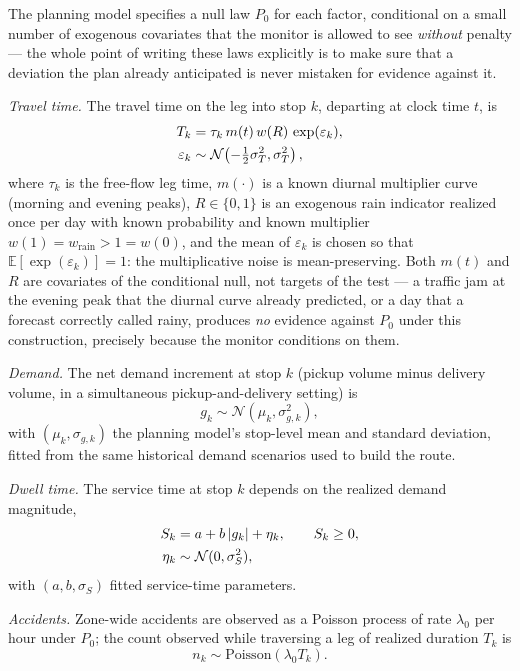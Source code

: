 \documentclass[trsc,dblanonrev]{informs4}
\newcommand{\E}{\mathbb{E}}
\newcommand{\N}{\mathcal{N}}
\begin{document}
The planning model specifies a null law $P_0$ for each factor,
conditional on a small number of exogenous covariates that the monitor
is allowed to see \emph{without} penalty --- the whole point of writing
these laws explicitly is to make sure that a deviation the plan already
anticipated is never mistaken for evidence against it.

\emph{Travel time.} The travel time on the leg into stop $k$, departing
at clock time $t$, is
\begin{align}
T_k &= \tau_k \, m(t) \, w(R) \, \exp(\varepsilon_k), \label{eq:travel}\\
\varepsilon_k &\sim \N\!\left(-\tfrac{1}{2}\sigma_T^2, \sigma_T^2\right),
\notag
\end{align}
where $\tau_k$ is the free-flow leg time, $m(\cdot)$ is a known diurnal
multiplier curve (morning and evening peaks), $R \in \{0,1\}$ is an
exogenous rain indicator realized once per day with known probability
and known multiplier $w(1) = w_{\mathrm{rain}} > 1 = w(0)$, and the mean
of $\varepsilon_k$ is chosen so that $\E[\exp(\varepsilon_k)] = 1$: the
multiplicative noise is mean-preserving. Both $m(t)$ and $R$ are
covariates of the conditional null, not targets of the test --- a traffic
jam at the evening peak that the diurnal curve already predicted, or a
day that a forecast correctly called rainy, produces \emph{no} evidence
against $P_0$ under this construction, precisely because the monitor
conditions on them.

\emph{Demand.} The net demand increment at stop $k$ (pickup volume
minus delivery volume, in a simultaneous pickup-and-delivery setting)
is
\begin{equation}\label{eq:demand}
g_k \sim \N(\mu_k, \sigma_{g,k}^2),
\end{equation}
with $(\mu_k, \sigma_{g,k})$ the planning model's stop-level mean and
standard deviation, fitted from the same historical demand scenarios
used to build the route.

\emph{Dwell time.} The service time at stop $k$ depends on the realized
demand magnitude,
\begin{align}
S_k &= a + b\,|g_k| + \eta_k, \qquad S_k \ge 0, \label{eq:dwell}\\
\eta_k &\sim \N(0, \sigma_S^2), \notag
\end{align}
with $(a,b,\sigma_S)$ fitted service-time parameters.

\emph{Accidents.} Zone-wide accidents are observed as a Poisson process
of rate $\lambda_0$ per hour under $P_0$; the count observed while
traversing a leg of realized duration $T_k$ is
\begin{equation}\label{eq:accident}
n_k \sim \mathrm{Poisson}(\lambda_0 T_k).
\end{equation}
\end{document}
